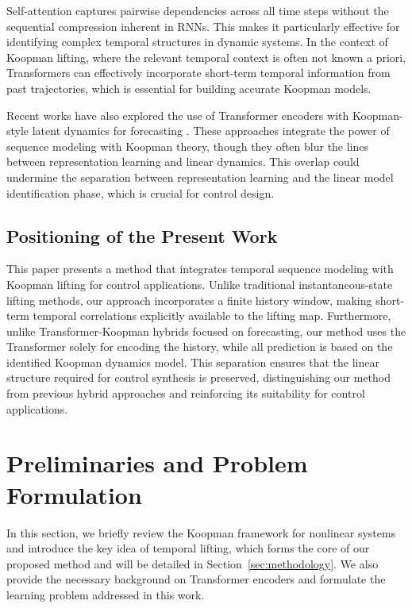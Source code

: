 \documentclass[journal]{IEEEtran}
\begin{document}
Self-attention captures pairwise dependencies across all time steps without the sequential compression inherent in RNNs. This makes it particularly effective for identifying complex temporal structures in dynamic systems. In the context of Koopman lifting, where the relevant temporal context is often not known a priori, Transformers can effectively incorporate short-term temporal information from past trajectories, which is essential for building accurate Koopman models.

Recent works have also explored the use of Transformer encoders with Koopman-style latent dynamics for forecasting \cite{forootani2026deepkoopformer, forootani2026spectral}. These approaches integrate the power of sequence modeling with Koopman theory, though they often blur the lines between representation learning and linear dynamics. This overlap could undermine the separation between representation learning and the linear model identification phase, which is crucial for control design.

\subsection{Positioning of the Present Work}
\label{subsec:positioning}

This paper presents a method that integrates temporal sequence modeling with Koopman lifting for control applications. Unlike traditional instantaneous-state lifting methods, our approach incorporates a finite history window, making short-term temporal correlations explicitly available to the lifting map. Furthermore, unlike Transformer-Koopman hybrids focused on forecasting, our method uses the Transformer solely for encoding the history, while all prediction is based on the identified Koopman dynamics model. This separation ensures that the linear structure required for control synthesis is preserved, distinguishing our method from previous hybrid approaches and reinforcing its suitability for control applications. 

\section{Preliminaries and Problem Formulation}
\label{sec:preliminaries_and_problem}

In this section, we briefly review the Koopman framework for nonlinear systems and introduce the key idea of temporal lifting, which forms the core of our proposed method and will be detailed in Section~\ref{sec:methodology}. We also provide the necessary background on Transformer encoders and formulate the learning problem addressed in this work.
\end{document}
